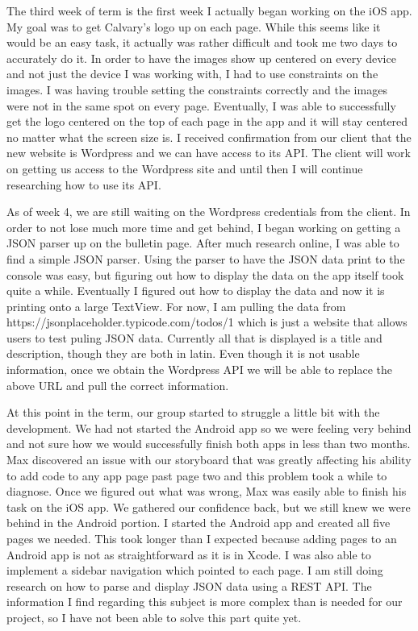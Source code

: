 \documentclass[letterpaper,10pt,draftclsnofoot,onecolumn,titlepage]{IEEEtran}
\begin{document}
	The third week of term is the first week I actually began working on the iOS app.
	My goal was to get Calvary's logo up on each page.
	While this seems like it would be an easy task, it actually was rather difficult and took me two days to accurately do it.
	In order to have the images show up centered on every device and not just the device I was working with, I had to use constraints on the images.
	I was having trouble setting the constraints correctly and the images were not in the same spot on every page.
	Eventually, I was able to successfully get the logo centered on the top of each page in the app and it will stay centered no matter what the screen size is.
	I received confirmation from our client that the new website is Wordpress and we can have access to its API.
	The client will work on getting us access to the Wordpress site and until then I will continue researching how to use its API.

	As of week 4, we are still waiting on the Wordpress credentials from the client.
	In order to not lose much more time and get behind, I began working on getting a JSON parser up on the bulletin page.
	After much research online, I was able to find a simple JSON parser.
	Using the parser to have the JSON data print to the console was easy, but figuring out how to display the data on the app itself took quite a while.
	Eventually I figured out how to display the data and now it is printing onto a large TextView.
	For now, I am pulling the data from https://jsonplaceholder.typicode.com/todos/1 which is just a website that allows users to test puling JSON data.
	Currently all that is displayed is a title and description, though they are both in latin.
	Even though it is not usable information, once we obtain the Wordpress API we will be able to replace the above URL and pull the correct information.

	At this point in the term, our group started to struggle a little bit with the development.
	We had not started the Android app so we were feeling very behind and not sure how we would successfully finish both apps in less than two months.
	Max discovered an issue with our storyboard that was greatly affecting his ability to add code to any app page past page two and this problem took a while to diagnose.
	Once we figured out what was wrong, Max was easily able to finish his task on the iOS app.
	We gathered our confidence back, but we still knew we were behind in the Android portion.
	I started the Android app and created all five pages we needed.
	This took longer than I expected because adding pages to an Android app is not as straightforward as it is in Xcode.
	I was also able to implement a sidebar navigation which pointed to each page.
	I am still doing research on how to parse and display JSON data using a REST API.
	The information I find regarding this subject is more complex than is needed for our project, so I have not been able to solve this part quite yet.
\end{document}
